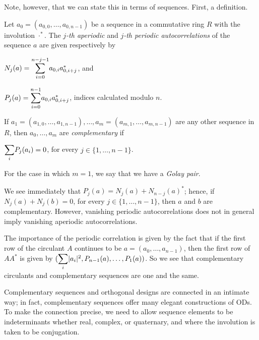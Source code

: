\documentclass[../../../main]{subfiles}
\begin{document}
 Note, however, that we can state this in terms of sequences. First, a definition.
 
 \begin{defin}
  Let $a_0=(a_{0,0}, \dots, a_{0,n-1})$ be a sequence in a commutative ring $R$ with the involution $\cdot^*$. The {\it $j$-th aperiodic} and {\it $j$-th periodic autocorrelations} of the sequence $a$ are given respectively by
  \begin{defenum}
   \item $N_j(a)=\ssum_{i=0}^{n-j-1}a_{0,i}a_{0,i+j}^*$, and
   \item $P_j(a)=\ssum_{i=0}^{n-1}a_{0,i}a_{0,i+j}^*$, indices calculated modulo $n$.
  \end{defenum}
  If $a_1=(a_{1,0},\dots,a_{1,n-1}),\dots,a_m=(a_{m,1},\dots,a_{m,n-1})$ are any other sequence in $R$, then $a_0,\dots,a_m$ are {\it complementary} if
  \begin{defenum}[resume]
   \item\label{periodic-comp} $\ssum_i P_j(a_i)=0$, for every $j \in \{1, \dots, n-1\}$.
  \end{defenum}
  For the case in which $m=1$, we say that we have a {\it Golay pair}.
 \end{defin}
 
 We see immediately that $P_j(a)=N_j(a) + N_{n-j}(a)^*$; hence, if $N_j(a)+N_j(b)=0$, for every $j \in \{1,\dots,n-1\}$, then $a$ and $b$ are complementary. However, vanishing periodic autocorrelations does not in general imply vanishing aperiodic autocorrelations.
 
 The importance of the periodic correlation is given by the fact that if the first row of the circulant $A$ continues to be $a=(a_0,\dots,a_{n-1})$, then the first row of $AA^*$ is given by $(\ssum_i|a_i|^2,P_{n-1}(a), \dots,P_1(a))$. So we see that complementary circulants and complementary sequences are one and the same.
 
 Complementary sequences and orthogonal designs are connected in an intimate way; in fact, complementary sequences offer many elegant constructions of ODs. To make the connection precise, we need to allow sequence elements to be indeterminants whether real, complex, or quaternary, and where the involution is taken to be conjugation.
 
\end{document}
